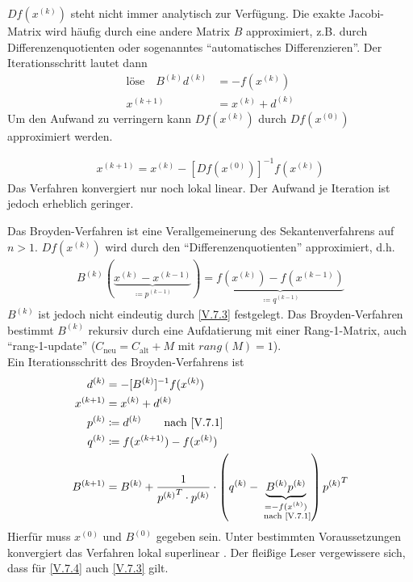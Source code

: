 $Df(x^{(k)})$ steht nicht immer analytisch zur Verfügung.
Die exakte Jacobi-Matrix wird häufig durch eine andere Matrix $B$ approximiert, 
z.B. durch Differenzenquotienten oder sogenanntes
\enquote{automatisches Differenzieren}.
Der Iterationsschritt lautet dann
\begin{align}
\text{löse}\quad B^{(k)}d^{(k)} &= -f(x^{(k)}) 
\label{V.7.1} \\\nonumber
x^{(k+1)} &=x^{(k)} + d^{(k)}
\end{align}
Um den Aufwand zu verringern kann $Df(x^{(k)})$ durch
$Df(x^{(0)})$ approximiert werden.


\begin{gather}
x^{(k+1)} = x^{(k)} -[Df(x^{(0)})]^{-1} f(x^{(k)})
\label{V.7.2}
\end{gather}
Das Verfahren konvergiert nur noch lokal linear.
Der Aufwand je Iteration ist jedoch erheblich geringer.



Das Broyden-Verfahren ist eine Verallgemeinerung des Sekantenverfahrens
auf $n>1$. $Df(x^{(k)})$ wird durch den
\enquote{Differenzenquotienten} approximiert, d.h.
\begin{gather}
B^{(k)}(\underbrace{x^{(k)}-x^{(k-1)}}_{\coloneqq p^{(k-1)}})
= \underbrace{f(x^{(k)})-f(x^{(k-1)})}_{\coloneqq
	q^{(k-1)}}
\label{V.7.3}
\end{gather}
$B^{(k)}$ ist jedoch nicht eindeutig durch \eqref{V.7.3} festgelegt.
Das Broyden-Verfahren bestimmt $B^{(k)}$ rekursiv durch eine 
Aufdatierung mit einer Rang-1-Matrix, auch \enquote{rang-1-update}
($C_\text{neu} = C_\text{alt} +M$ mit $rang(M)=1$). \\

Ein Iterationsschritt des Broyden-Verfahrens ist 
\begin{align}\nonumber
d^{(k)} &= -[B^{(k)}]^{-1} f(x^{(k)}) \\\nonumber
x^{(k+1)} &= x^{(k)} + d^{(k)} \\\nonumber
p^{(k)} & \coloneqq d^{(k)} \qquad \text{nach
	\eqref{V.7.1}}\\\nonumber
q^{(k)} & \coloneqq f(x^{(k+1)})-f(x^{(k)}) \\
B^{(k+1)} & = B^{(k)} + \frac{1}{{p^{(k)}}^T\cdot p^{(k)}}
\cdot \left(q^{(k)}-
\underbrace{B^{(k)}p^{(k)}}_{\substack{=-f(x^{(k)})\\
		\text{ nach \eqref{V.7.1}}}}
\right){p^{(k)}}^T
\label{V.7.4}
\end{align}
Hierfür muss $x^{(0)} $ und $B^{(0)}$ gegeben sein.
Unter bestimmten Voraussetzungen konvergiert das Verfahren lokal
superlinear \cite[siehe][dortige Referenzen]{stoerbulirsch}.
Der fleißige Leser vergewissere sich, dass für
\eqref{V.7.4} auch \eqref{V.7.3} gilt.


